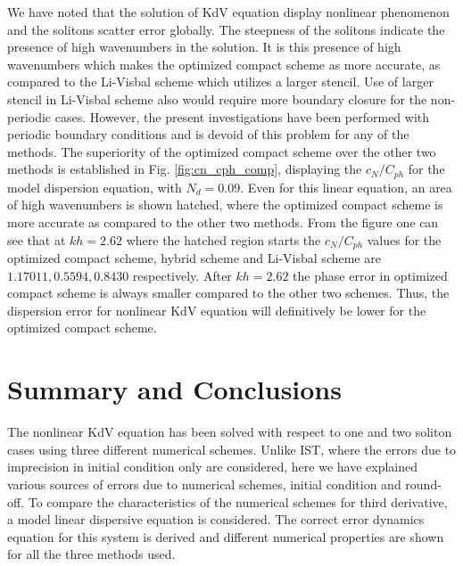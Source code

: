 We have noted that the solution of KdV equation display nonlinear phenomenon and the solitons scatter error globally. The steepness of the solitons
indicate the presence of high wavenumbers in the solution. It is this presence of high wavenumbers which makes the optimized compact scheme as more 
accurate, as compared to the Li-Visbal scheme which utilizes a larger stencil. Use of larger stencil in Li-Visbal scheme also would require more boundary closure for the non-periodic cases. However, the present investigations have been performed with periodic boundary conditions and is devoid of this problem for any of the methods. The superiority of the optimized compact scheme over the other two methods is established in Fig. \ref{fig:cn_cph_comp}, displaying the $c_N/C_{ph}$ for the model dispersion equation, with $N_d =0.09$. Even for this linear equation, an area of high wavenumbers is shown hatched, where the optimized compact scheme is more accurate as compared to the other two methods. From the figure one can see that at $kh =2.62$ where the hatched region starts the $c_N/C_{ph}$ values for the optimized compact scheme, hybrid scheme and Li-Visbal scheme are $1.17011, 0.5594, 0.8430$ respectively. After $kh =2.62$ the phase error in optimized compact scheme is always smaller compared to the other two schemes. Thus, the dispersion error for nonlinear KdV equation will definitively be lower for the optimized compact scheme.  

\section{Summary and Conclusions}
\label{sec:sum}
The nonlinear KdV equation has been solved with respect to one and two soliton cases using three different numerical schemes. Unlike IST, where the errors due to imprecision in initial condition only are considered, here we have explained various sources of errors due to numerical schemes, initial condition and round-off. To compare the characteristics of the numerical schemes for third derivative, a model linear dispersive equation is considered. The correct error dynamics equation for this system is derived and different numerical properties are shown for all the three methods used.  

